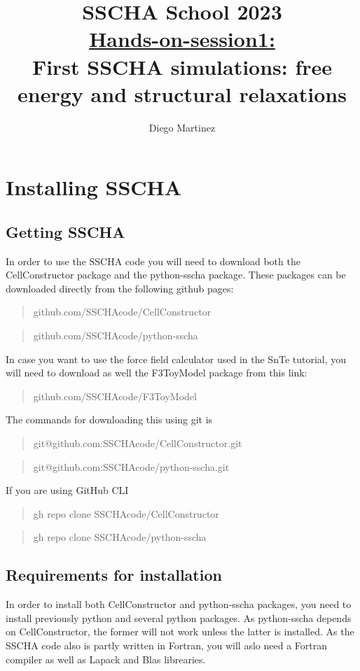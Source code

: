 \documentclass[]{report}
\title{\textbf{SSCHA School 2023} \\ \underline{Hands-on-session1:}\\ First SSCHA simulations: free energy and structural relaxations}
\author{Diego Martinez}
\begin{document}
\maketitle

\chapter{Installing SSCHA}
\section{Getting SSCHA}
In order to use the SSCHA code you will need to download both the CellConstructor package and the python-sscha package. These packages can be downloaded directly from the following github pages:

\begin{quotation}
	github.com/SSCHAcode/CellConstructor
\end{quotation}

\begin{quotation}
	github.com/SSCHAcode/python-sscha
\end{quotation}

In case you want to use the force field calculator used in the SnTe tutorial, you will need to download as well the F3ToyModel package from this link:

\begin{quotation}
	github.com/SSCHAcode/F3ToyModel
\end{quotation}
The commands for downloading this using git is 
\begin{quotation}
	git@github.com:SSCHAcode/CellConstructor.git
\end{quotation}
\begin{quotation}
	git@github.com:SSCHAcode/python-sscha.git
\end{quotation}

If you are using GitHub CLI
\begin{quotation}
	gh repo clone SSCHAcode/CellConstructor
\end{quotation}
\begin{quotation}
	gh repo clone SSCHAcode/python-sscha
\end{quotation}
\section{Requirements for installation}
In order to install both CellConstructor and python-sscha packages, you need to install previously python and several python packages. As python-sscha depends on CellConstructor, the former will not work unless the latter is installed. As the SSCHA code also is partly written in Fortran, you will aslo need a Fortran compiler as well as Lapack and Blas librearies.
\end{document}
